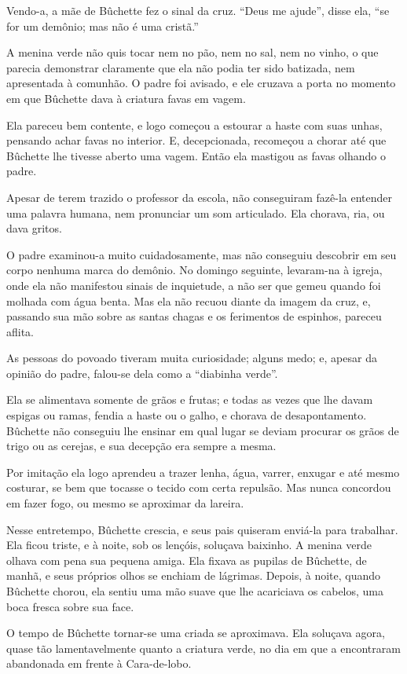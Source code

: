 Vendo-a, a mãe de Bûchette fez o sinal da cruz. “Deus me ajude'', disse
ela, ``se for um demônio; mas não é uma cristã.”

A menina verde não quis tocar nem no pão, nem no sal, nem no vinho, o
que parecia demonstrar claramente que ela não podia ter sido batizada, nem
apresentada à comunhão. O padre foi avisado, e ele cruzava a porta no
momento em que Bûchette dava à criatura favas em vagem.

Ela pareceu bem contente, e logo começou a estourar a haste com suas
unhas, pensando achar favas no interior. E, decepcionada, recomeçou a
chorar até que Bûchette lhe tivesse aberto uma vagem. Então ela mastigou
as favas olhando o padre.

Apesar de terem trazido o professor da escola, não conseguiram fazê-la
entender uma palavra humana, nem pronunciar um som articulado. Ela
chorava, ria, ou dava gritos.

O padre examinou-a muito cuidadosamente, mas não conseguiu descobrir em
seu corpo nenhuma marca do demônio. No domingo seguinte, levaram-na à
igreja, onde ela não manifestou sinais de inquietude, a não ser que gemeu
quando foi molhada com água benta. Mas ela não recuou diante da imagem da
cruz, e, passando sua mão sobre as santas chagas e os ferimentos de
espinhos, pareceu aflita.

As pessoas do povoado tiveram muita curiosidade; alguns medo; e, apesar
da opinião do padre, falou-se dela como a “diabinha verde”.

Ela se alimentava somente de grãos e frutas; e todas as vezes que lhe
davam espigas ou ramas, fendia a haste ou o galho, e chorava de
desapontamento. Bûchette não conseguiu lhe ensinar em qual lugar se deviam
procurar os grãos de trigo ou as cerejas, e sua decepção era sempre a
mesma.

Por imitação ela logo aprendeu a trazer lenha, água, varrer, enxugar e
até mesmo costurar, se bem que tocasse o tecido com certa repulsão. Mas
nunca concordou em fazer fogo, ou mesmo se aproximar da lareira.

Nesse entretempo, Bûchette crescia, e seus pais quiseram enviá-la para
trabalhar. Ela ficou triste, e à noite, sob os lençóis, soluçava baixinho.
A menina verde olhava com pena sua pequena amiga. Ela fixava as pupilas de
Bûchette, de manhã, e seus próprios olhos se enchiam de lágrimas. Depois,
à noite, quando Bûchette chorou, ela sentiu uma mão suave
que lhe acariciava os cabelos, uma boca fresca sobre sua face.

O tempo de Bûchette tornar-se uma criada se aproximava. Ela soluçava
agora, quase tão lamentavelmente quanto a criatura verde, no dia em que a
encontraram abandonada em frente à Cara-de-lobo.

